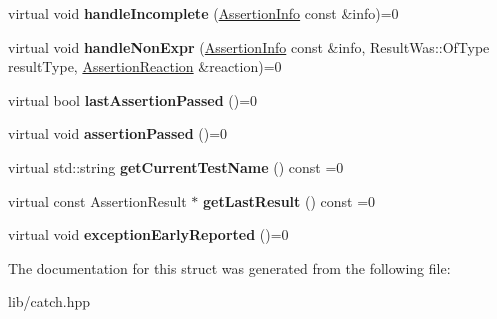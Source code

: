 \begin{DoxyCompactItemize}
\item 
\mbox{\label{struct_catch_1_1_i_result_capture_a89b89372eb09cc44f8dcad363de6157d}} 
virtual void {\bfseries handle\+Incomplete} (\mbox{\hyperlink{struct_catch_1_1_assertion_info}{Assertion\+Info}} const \&info)=0
\item 
\mbox{\label{struct_catch_1_1_i_result_capture_ab7dbdf8aa28427119583e24dbb302c63}} 
virtual void {\bfseries handle\+Non\+Expr} (\mbox{\hyperlink{struct_catch_1_1_assertion_info}{Assertion\+Info}} const \&info, Result\+Was\+::\+Of\+Type result\+Type, \mbox{\hyperlink{struct_catch_1_1_assertion_reaction}{Assertion\+Reaction}} \&reaction)=0
\item 
\mbox{\label{struct_catch_1_1_i_result_capture_a973435fbdcb2f6f07a0ec5719a01e956}} 
virtual bool {\bfseries last\+Assertion\+Passed} ()=0
\item 
\mbox{\label{struct_catch_1_1_i_result_capture_a9b0ef2cb071e9a9dc6ec1b533026aea7}} 
virtual void {\bfseries assertion\+Passed} ()=0
\item 
\mbox{\label{struct_catch_1_1_i_result_capture_aea1617f4a84cc648246aa3ed6918b5bf}} 
virtual std\+::string {\bfseries get\+Current\+Test\+Name} () const =0
\item 
\mbox{\label{struct_catch_1_1_i_result_capture_ab18872c89fab97405a56e9c6a4919736}} 
virtual const Assertion\+Result $\ast$ {\bfseries get\+Last\+Result} () const =0
\item 
\mbox{\label{struct_catch_1_1_i_result_capture_ae63ecec95db4c236c63ecf616f483810}} 
virtual void {\bfseries exception\+Early\+Reported} ()=0
\end{DoxyCompactItemize}


The documentation for this struct was generated from the following file\+:\begin{DoxyCompactItemize}
\item 
lib/catch.\+hpp\end{DoxyCompactItemize}
